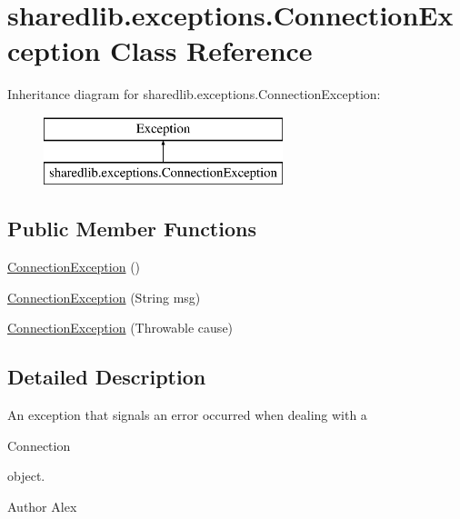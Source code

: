 \hypertarget{classsharedlib_1_1exceptions_1_1_connection_exception}{}\section{sharedlib.\+exceptions.\+Connection\+Exception Class Reference}
\label{classsharedlib_1_1exceptions_1_1_connection_exception}
Inheritance diagram for sharedlib.\+exceptions.\+Connection\+Exception\+:\begin{figure}[H]
\begin{center}
\leavevmode
\includegraphics[height=2.000000cm]{classsharedlib_1_1exceptions_1_1_connection_exception}
\end{center}
\end{figure}
\subsection*{Public Member Functions}
\begin{DoxyCompactItemize}
\item 
\hyperlink{classsharedlib_1_1exceptions_1_1_connection_exception_a397c11fd9538e41ab81872b57f870b53}{Connection\+Exception} ()
\item 
\hyperlink{classsharedlib_1_1exceptions_1_1_connection_exception_a17c37af7851d6482d95753064483d045}{Connection\+Exception} (String msg)
\item 
\hyperlink{classsharedlib_1_1exceptions_1_1_connection_exception_a6148dbd8940197621d740066e0506b8b}{Connection\+Exception} (Throwable cause)
\end{DoxyCompactItemize}


\subsection{Detailed Description}
An exception that signals an error occurred when dealing with a 
\begin{DoxyCode}
Connection 
\end{DoxyCode}
 object.

\begin{DoxyAuthor}{Author}
Alex 
\end{DoxyAuthor}


